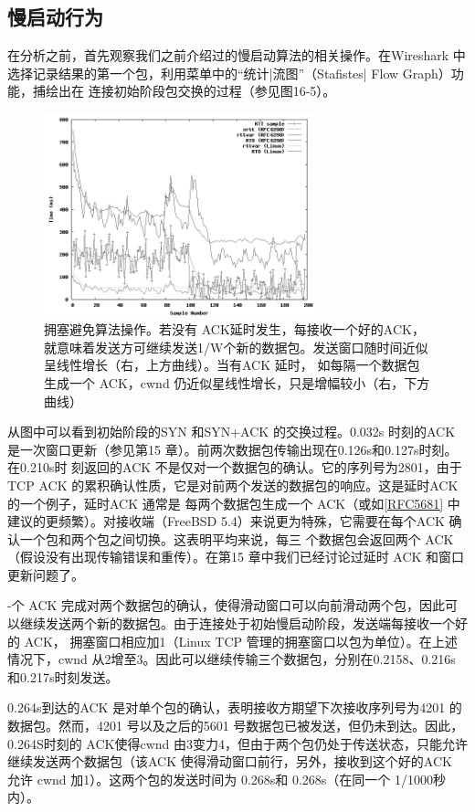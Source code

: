 \subsection{慢启动行为}
在分析之前，首先观察我们之前介绍过的慢启动算法的相关操作。在Wireshark 中选择记录结果的第一个包，利用菜单中的“统计|流图”（Stafistes| Flow Graph）功能，捕绘出在
连接初始阶段包交换的过程（参见图16-5）。

\begin{figure}[!htb]
    \centering
	\includegraphics[width=0.7\textwidth]{imgs/14/14-3.png}
	\caption{拥塞避免算法操作。若没有 ACK延时发生，每接收一个好的ACK，就意味着发送方可继续发送1/W个新的数据包。发送窗口随时间近似呈线性增长（右，上方曲线）。当有ACK 延时，
    如每隔一个数据包生成一个 ACK，cwnd 仍近似星线性增长，只是增幅较小（右，下方曲线）}
\end{figure}

从图中可以看到初始阶段的SYN 和SYN+ACK 的交换过程。0.032s 时刻的ACK 是一次窗口更新（参见第15 章）。前两次数据包传输出现在0.126s和0.127s时刻。在0.210s时
刻返回的ACK 不是仅对一个数据包的确认。它的序列号为2801，由于 TCP ACK 的累积确认性质，它是对前两个发送的数据包的响应。这是延时ACK 的一个例子，延时ACK 通常是
每两个数据包生成一个 ACK（或如\href{https://www.rfc-editor.org/rfc/rfc5681}{[RFC5681]} 中建议的更频繁）。对接收端（FreeBSD 5.4）来说更为特殊，它需要在每个ACK 确认一个包和两个包之间切换。这表明平均来说，每三
个数据包会返回两个 ACK（假设没有出现传输错误和重传）。在第15 章中我们已经讨论过延时 ACK 和窗口更新问题了。

-个 ACK 完成对两个数据包的确认，使得滑动窗口可以向前滑动两个包，因此可以继续发送两个新的数据包。由于连接处于初始慢启动阶段，发送端每接收一个好的 ACK，
拥塞窗口相应加1（Linux TCP 管理的拥塞窗口以包为单位）。在上述情况下，cwnd 从2增至3。因此可以继续传输三个数据包，分别在0.2158、0.216s 和0.217s时刻发送。

0.264s到达的ACK 是对单个包的确认，表明接收方期望下次接收序列号为4201 的数据包。然而，4201 号以及之后的5601 号数据包已被发送，但仍未到达。因此，0.264S时刻的
ACK使得cwnd 由3变力4，但由于两个包仍处于传送状态，只能允许继续发送两个数据包（该ACK 使得滑动窗口前行，另外，接收到这个好的ACK 允许
cwnd 加1）。这两个包的发送时间为 0.268s和 0.268s（在同一个 1/1000秒内）。

